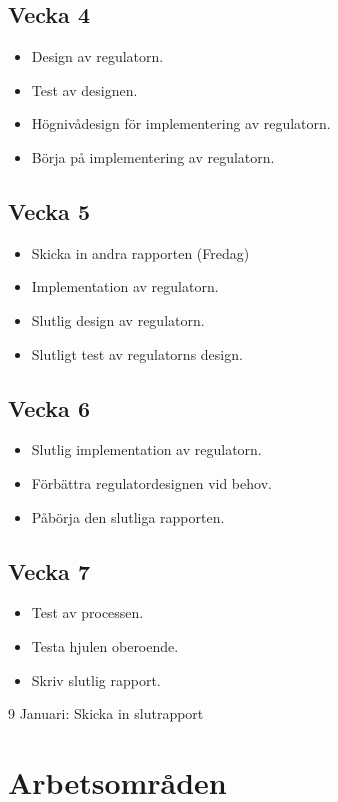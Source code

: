 \documentclass[a4paper]{article}
\begin{document}
    \subsection*{Vecka 4}
    \begin{itemize}
	\item Design av regulatorn.
    \item Test av designen.
    \item Högnivådesign för implementering av regulatorn.
    \item Börja på implementering av regulatorn.
	\end{itemize}
    
    \subsection*{Vecka 5}
    \begin{itemize}
    \item Skicka in andra rapporten (Fredag)
	\item Implementation av regulatorn.
    \item Slutlig design av regulatorn.
    \item Slutligt test av regulatorns design.
	\end{itemize}
    
    \subsection*{Vecka 6}
    \begin{itemize}
	\item Slutlig implementation av regulatorn.
    \item Förbättra regulatordesignen vid behov.
    \item Påbörja den slutliga rapporten.
	\end{itemize}
    
    \subsection*{Vecka 7}
    \begin{itemize}
	\item Test av processen.
    \item Testa hjulen oberoende.
    \item Skriv slutlig rapport.
	\end{itemize}

9 Januari: Skicka in slutrapport

\section{Arbetsområden}
	
\end{document}
